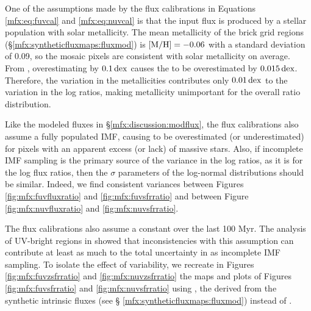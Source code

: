 \documentclass[iop, tighten]{emulateapj}
\begin{document}
One of the assumptions made by the flux calibrations in Equations
\ref{mfx:eq:fuvcal} and \ref{mfx:eq:nuvcal} is that the input flux is produced
by a stellar population with solar metallicity. The mean metallicity of the
brick grid regions (\S \ref{mfx:syntheticfluxmaps:fluxmod}) is $\mathrm{[M/H]} = -0.06$
with a standard deviation of 0.09, so the mosaic pixels are consistent with
solar metallicity on average. From \citet{Simones:2014}, overestimating \met{}
by $0.1\,\mathrm{dex}$ causes the \sfr{} to be overestimated by $0.015\,\mathrm{dex}$. Therefore,
the variation in the metallicities contributes only $0.01\,\mathrm{dex}$ to the variation
in the log \sfr{} ratios, making metallicity unimportant for the overall \sfr{}
ratio distribution.

Like the modeled fluxes in \S \ref{mfx:discussion:modflux}, the flux
calibrations also assume a fully populated IMF, causing \sfrx{} to be
overestimated (or underestimated) for pixels with an apparent excess (or lack)
of massive stars. Also, if incomplete IMF sampling is the primary source of the
variance in the log \sfr{} ratios, as it is for the log flux ratios, then the
$\sigma$ parameters of the log-normal distributions should be similar. Indeed,
we find consistent variances between Figures \ref{fig:mfx:fuvfluxratio} and
\ref{fig:mfx:fuvsfrratio} and between Figure \ref{fig:mfx:nuvfluxratio} and
\ref{fig:mfx:nuvsfrratio}.

The flux calibrations also assume a constant \sfh{} over the last 100 Myr. The
analysis of UV-bright regions in \citet{Simones:2014} showed that
inconsistencies with this assumption can contribute at least as much to the
total uncertainty in \sfrfuv{} as incomplete IMF sampling. To isolate the
effect of \sfh{} variability, we recreate in Figures \ref{fig:mfx:fuvzsfrratio}
and \ref{fig:mfx:nuvzsfrratio} the maps and plots of Figures
\ref{fig:mfx:fuvsfrratio} and \ref{fig:mfx:nuvsfrratio} using \sfrxz{}, the
 derived from the synthetic intrinsic fluxes (see \S
\ref{mfx:syntheticfluxmaps:fluxmod}) instead of \sfrx{}.
\end{document}
